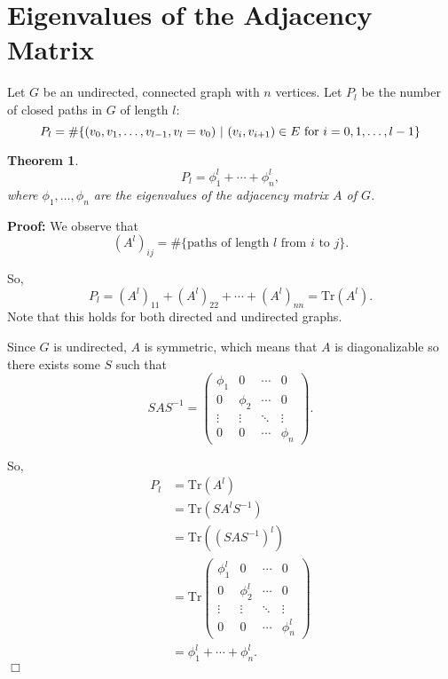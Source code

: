 \documentclass[11pt]{article}
\newtheorem{theorem}{Theorem}
\newenvironment{proof}{\noindent \textbf{Proof:}}{$\Box$}
\begin{document}
\section{Eigenvalues of the Adjacency Matrix}

Let $G$ be an undirected, connected graph with $n$ vertices.  Let $P_l$ be the number of closed paths in $G$ of length $l$:
$$P_l = \#\{(v_0,v_1,\ldots,v_{l-1},v_l = v_0)~|~(v_i,v_{i+1}) \in E \textup{ for $i = 0,1,\ldots,l-1$}\}$$

\begin{theorem}
$$P_l = \phi_1^l + \cdots + \phi_n^l,$$
where $\phi_1, \ldots, \phi_n$ are the eigenvalues of the adjacency matrix $A$ of $G$.
\end{theorem}

\begin{proof}
We observe that
$$ (A^l)_{ij} = \#\{\text{paths of length $l$ from $i$ to $j$}\}.$$

So,
$$P_l = (A^l)_{11} + (A^l)_{22} + \cdots + (A^l)_{nn} = \mathrm{Tr}(A^l).$$
Note that this holds for both directed and undirected graphs.

Since $G$ is undirected, $A$ is symmetric, which means that $A$ is diagonalizable so there exists some $S$ such that
$$ SAS^{-1} = 
\begin{pmatrix}
\phi_1 & 0 & \cdots & 0 \\
0 & \phi_2 & \cdots & 0 \\
\vdots & \vdots & \ddots & \vdots \\
0 & 0 & \cdots & \phi_n
\end{pmatrix}.
$$

So,
$$
\begin{aligned}
P_l &= \mathrm{Tr}(A^l) \\
&= \mathrm{Tr}(SA^lS^{-1}) \\
&= \mathrm{Tr}((SAS^{-1})^l) \\
&= \mathrm{Tr}
\begin{pmatrix}
\phi_1^l & 0 & \cdots & 0 \\
0 & \phi_2^l & \cdots & 0 \\
\vdots & \vdots & \ddots & \vdots \\
0 & 0 & \cdots & \phi_n^l
\end{pmatrix}\\
&= \phi_1^l + \cdots + \phi_n^l.
\end{aligned}
$$
\end{proof}
\end{document}
